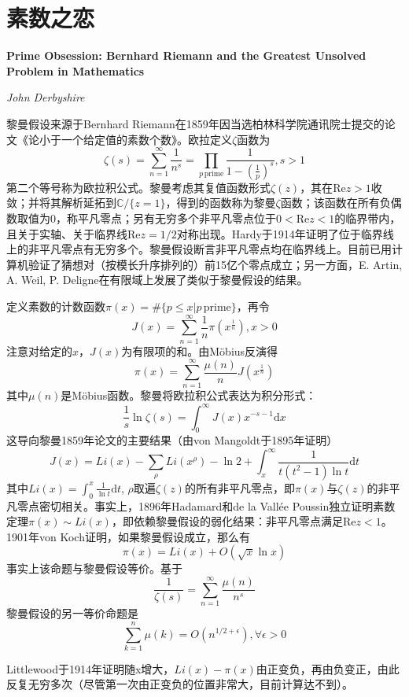 \chapter{素数之恋} \label{chap:rh}
\Large\textbf{Prime Obsession: Bernhard Riemann and the Greatest Unsolved Problem in Mathematics}
\par \emph{John Derbyshire} \normalsize

\par 黎曼假设来源于Bernhard Riemann在1859年因当选柏林科学院通讯院士提交的论文《论小于一个给定值的素数个数》。欧拉定义$\zeta$函数为
\begin{equation}
    \zeta(s)=\sum_{n=1}^\infty \frac{1}{n^s}=\prod_{p\, \text{prime}}\frac{1}{1-(\frac{1}{p})^s}, s>1
\end{equation}
第二个等号称为欧拉积公式。黎曼考虑其复值函数形式$\zeta(z)$，其在$\text{Re}z>1$收敛；并将其解析延拓到$\mathbb{C}/\{z=1\}$，得到的函数称为黎曼$\zeta$函数；该函数在所有负偶数取值为0，称平凡零点；另有无穷多个非平凡零点位于$0<\text{Re}z<1$的临界带内，且关于实轴、关于临界线$\text{Re}z=1/2$对称出现。Hardy于1914年证明了位于临界线上的非平凡零点有无穷多个。黎曼假设断言非平凡零点均在临界线上。目前已用计算机验证了猜想对（按模长升序排列的）前15亿个零点成立；另一方面，E. Artin, A. Weil, P. Deligne在有限域上发展了类似于黎曼假设的结果。
\par 定义素数的计数函数$\pi(x)=\#\{p\le x\vert p\, \text{prime}\}$，再令
\begin{equation}
    J(x)=\sum_{n=1}^\infty \frac{1}{n}\pi(x^{\frac{1}{n}}), x>0
\end{equation}
注意对给定的$x$，$J(x)$为有限项的和。由Möbius反演得
\begin{equation}
    \pi(x)=\sum_{n=1}^\infty \frac{\mu(n)}{n}J(x^{\frac{1}{n}})
\end{equation}
其中$\mu(n)$是Möbius函数。黎曼将欧拉积公式表达为积分形式：
\begin{equation}
    \frac{1}{s}\ln\zeta(s)=\int_0^\infty J(x)x^{-s-1}\mathrm{d}x
\end{equation}
这导向黎曼1859年论文的主要结果（由von Mangoldt于1895年证明）
\begin{equation}
    J(x)=Li(x)-\sum_\rho Li(x^\rho)-\ln 2 +\int_x^\infty \frac{1}{t(t^2-1)\ln t}\mathrm{d}t
\end{equation}
其中$Li(x)=\int_0^x \frac{1}{\ln t}\mathrm{d}t$, $\rho$取遍$\zeta(z)$的所有非平凡零点，即$\pi(x)$与$\zeta(z)$的非平凡零点密切相关。事实上，1896年Hadamard和de la Vallée Poussin独立证明素数定理$\pi(x)\sim Li(x)$，即依赖黎曼假设的弱化结果：非平凡零点满足$\text{Re} z<1$。1901年von Koch证明，如果黎曼假设成立，那么有
\begin{equation}
    \pi(x)=Li(x)+O(\sqrt{x}\ln x)
\end{equation}
事实上该命题与黎曼假设等价。基于
\begin{equation}
    \frac{1}{\zeta(s)}=\sum_{n=1}^\infty \frac{\mu(n)}{n^s}
\end{equation}
黎曼假设的另一等价命题是
\begin{equation}
    \sum_{k=1}^n\mu(k)=O(n^{1/2+\epsilon}), \forall \epsilon>0
\end{equation}
\par Littlewood于1914年证明随x增大，$Li(x)-\pi(x)$由正变负，再由负变正，由此反复无穷多次（尽管第一次由正变负的位置非常大，目前计算达不到）。
